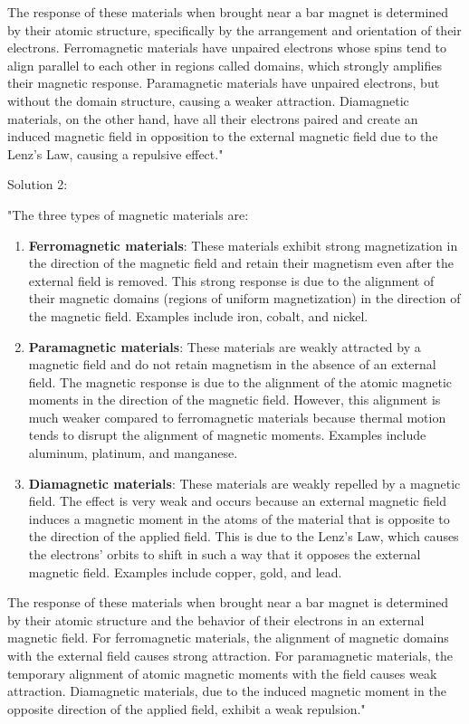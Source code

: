 The response of these materials when brought near a bar magnet is determined by their atomic structure, specifically by the arrangement and orientation of their electrons. Ferromagnetic materials have unpaired electrons whose spins tend to align parallel to each other in regions called domains, which strongly amplifies their magnetic response. Paramagnetic materials have unpaired electrons, but without the domain structure, causing a weaker attraction. Diamagnetic materials, on the other hand, have all their electrons paired and create an induced magnetic field in opposition to the external magnetic field due to the Lenz's Law, causing a repulsive effect."

Solution 2: 

"The three types of magnetic materials are:

\begin{enumerate}
    \item \textbf{Ferromagnetic materials}: These materials exhibit strong magnetization in the direction of the magnetic field and retain their magnetism even after the external field is removed. This strong response is due to the alignment of their magnetic domains (regions of uniform magnetization) in the direction of the magnetic field. Examples include iron, cobalt, and nickel.
    \item \textbf{Paramagnetic materials}: These materials are weakly attracted by a magnetic field and do not retain magnetism in the absence of an external field. The magnetic response is due to the alignment of the atomic magnetic moments in the direction of the magnetic field. However, this alignment is much weaker compared to ferromagnetic materials because thermal motion tends to disrupt the alignment of magnetic moments. Examples include aluminum, platinum, and manganese.
    \item \textbf{Diamagnetic materials}: These materials are weakly repelled by a magnetic field. The effect is very weak and occurs because an external magnetic field induces a magnetic moment in the atoms of the material that is opposite to the direction of the applied field. This is due to the Lenz's Law, which causes the electrons' orbits to shift in such a way that it opposes the external magnetic field. Examples include copper, gold, and lead.
\end{enumerate}

The response of these materials when brought near a bar magnet is determined by their atomic structure and the behavior of their electrons in an external magnetic field. For ferromagnetic materials, the alignment of magnetic domains with the external field causes strong attraction. For paramagnetic materials, the temporary alignment of atomic magnetic moments with the field causes weak attraction. Diamagnetic materials, due to the induced magnetic moment in the opposite direction of the applied field, exhibit a weak repulsion."

